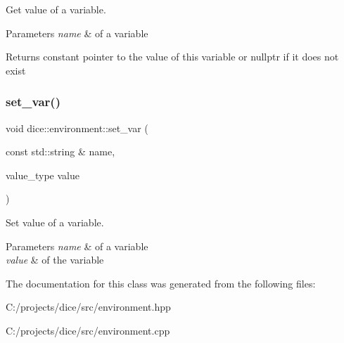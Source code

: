 Get value of a variable. 


\begin{DoxyParams}{Parameters}
{\em name} & of a variable\\
\hline
\end{DoxyParams}
\begin{DoxyReturn}{Returns}
constant pointer to the value of this variable or nullptr if it does not exist 
\end{DoxyReturn}
\mbox{\label{classdice_1_1environment_a5bf1f80a5a2958ac8bb1c546535bdfde}} 
\subsubsection{\texorpdfstring{set\+\_\+var()}{set\_var()}}
{\footnotesize\ttfamily void dice\+::environment\+::set\+\_\+var (\begin{DoxyParamCaption}\item[{const std\+::string \&}]{name,  }\item[{value\+\_\+type}]{value }\end{DoxyParamCaption})}



Set value of a variable. 


\begin{DoxyParams}{Parameters}
{\em name} & of a variable \\
\hline
{\em value} & of the variable \\
\hline
\end{DoxyParams}


The documentation for this class was generated from the following files\+:\begin{DoxyCompactItemize}
\item 
C\+:/projects/dice/src/environment.\+hpp\item 
C\+:/projects/dice/src/environment.\+cpp\end{DoxyCompactItemize}
